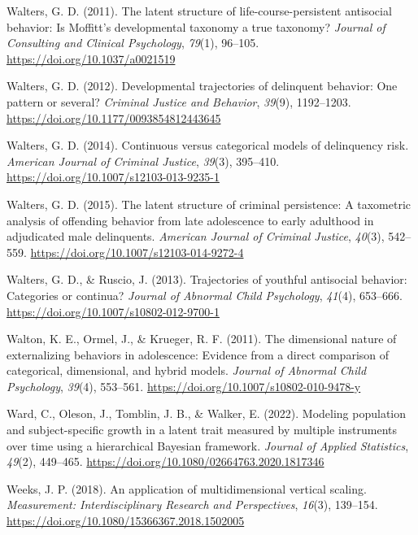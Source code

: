 \documentclass[
  american,
  letterpaper,
  12pt]{article}
\newlength{\cslhangindent}
\newenvironment{CSLReferences}[2] %
 {\begin{list}{}{%
  \setlength{\itemindent}{0pt}
  \setlength{\leftmargin}{0pt}
  \setlength{\parsep}{0pt}
  \ifodd #1
   \setlength{\leftmargin}{\cslhangindent}
   \setlength{\itemindent}{-1\cslhangindent}
  \fi
  \setlength{\itemsep}{#2\baselineskip}}}
 {\end{list}}
\begin{document}
\begin{CSLReferences}{1}{0}
Walters, G. D. (2011). The latent structure of life-course-persistent
antisocial behavior: {Is} {Moffitt's} developmental taxonomy a true
taxonomy? \emph{Journal of Consulting and Clinical Psychology},
\emph{79}(1), 96--105. \url{https://doi.org/10.1037/a0021519}

Walters, G. D. (2012). Developmental trajectories of delinquent
behavior: {One} pattern or several? \emph{Criminal Justice and
Behavior}, \emph{39}(9), 1192--1203.
\url{https://doi.org/10.1177/0093854812443645}

Walters, G. D. (2014). Continuous versus categorical models of
delinquency risk. \emph{American Journal of Criminal Justice},
\emph{39}(3), 395--410. \url{https://doi.org/10.1007/s12103-013-9235-1}

Walters, G. D. (2015). The latent structure of criminal persistence: {A}
taxometric analysis of offending behavior from late adolescence to early
adulthood in adjudicated male delinquents. \emph{American Journal of
Criminal Justice}, \emph{40}(3), 542--559.
\url{https://doi.org/10.1007/s12103-014-9272-4}

Walters, G. D., \& Ruscio, J. (2013). Trajectories of youthful
antisocial behavior: {Categories} or continua? \emph{Journal of Abnormal
Child Psychology}, \emph{41}(4), 653--666.
\url{https://doi.org/10.1007/s10802-012-9700-1}

Walton, K. E., Ormel, J., \& Krueger, R. F. (2011). The dimensional
nature of externalizing behaviors in adolescence: {Evidence} from a
direct comparison of categorical, dimensional, and hybrid models.
\emph{Journal of Abnormal Child Psychology}, \emph{39}(4), 553--561.
\url{https://doi.org/10.1007/s10802-010-9478-y}

Ward, C., Oleson, J., Tomblin, J. B., \& Walker, E. (2022). Modeling
population and subject-specific growth in a latent trait measured by
multiple instruments over time using a hierarchical {Bayesian}
framework. \emph{Journal of Applied Statistics}, \emph{49}(2), 449--465.
\url{https://doi.org/10.1080/02664763.2020.1817346}

Weeks, J. P. (2018). An application of multidimensional vertical
scaling. \emph{Measurement: Interdisciplinary Research and
Perspectives}, \emph{16}(3), 139--154.
\url{https://doi.org/10.1080/15366367.2018.1502005}


\end{CSLReferences}
\end{document}
